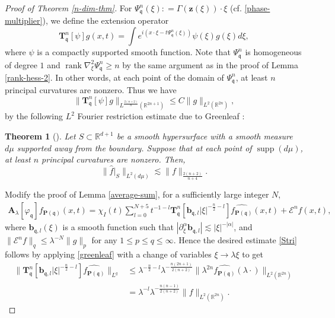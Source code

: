 \documentclass[10pt] %
{amsart}
\theoremstyle{plain}
\newtheorem{thm}{Theorem}[section]
\numberwithin{equation}{section}
\newcommand{\R}{\mathbb R}
\DeclareMathOperator{\supp}{supp}
\DeclareMathOperator{\rank}{rank}
\newcommand{\fq}{\mathfrak q}
\begin{document}
\begin{proof}[Proof of Theorem \ref{n-dim-thm}]
For $ \Psi_\fq^n (\xi) : = \Gamma(\mathbf z(\xi))\cdot \xi $ (cf. \eqref{phase-multiplier}), we define the extension operator
\[
\mathbf T_{\fq}^n [\psi] g(x,t) = \int e^{i  (x\cdot \xi - t \Psi_\fq^n (\xi)) } \psi(\xi) g(\xi) d\xi ,
\]
where $\psi$ is a compactly supported smooth function. 
Note that $\Psi_\fq^n$ is homogeneous of degree $1$ and $\rank \nabla_\xi^2 \Psi_\fq^n \ge n$ by the same argument as in the proof of Lemma \ref{rank-hess-2}. 
In other words, at each point of the domain of $ \Psi_\fq^n $, at least $n$ principal curvatures are nonzero. 
Thus we have
\begin{equation}\label{greenleaf}
\| \mathbf T_{\fq}^n [\psi] g\|_{L^{\frac{2(n+2)}{n}}(\mathbb R^{2n+1})} \le C \| g\|_{L^2(\mathbb R^{2n})} ,
\end{equation}
by the following $L^2$ Fourier restriction estimate due to Greenleaf \cite{Gr81}:
\begin{thm}[{\cite[Corollary 1]{Gr81}}]
Let $S\subset \R^{d+1}$ be a smooth hypersurface with a smooth measure $d\mu$ supported away from the boundary. Suppose that at each point of $\supp (d\mu)$, at least $n$ principal curvatures are nonzero. Then,  
\[
\big\| \widehat f \big|_S \big\|_{L^2(d\mu)} \lesssim \|f\|_{\frac{2(n+2)}{n+4}} .
\]
\end{thm}

 
Modify the proof of Lemma \ref{average-sum}, for a sufficiently large integer $N$, 
\begin{align*} 
\mathbf A_\lambda[\varphi_{\fq}] f_{\mathbf P(\fq)}(x,t)   = \chi_I(t) \sum_{l=0}^{N+5} t^{-1-l}   \mathbf T_\fq^n [\mathbf b_{\fq,l}|\xi|^{-\frac n2-l}] \widehat {f_{\mathbf P(\fq)}}   (x,t)+  \mathcal E^n  f   (x,t),
\end{align*}
 where  $\mathbf b_{\fq,l} (\xi)    $ is a smooth function such that $|\partial_\xi^\alpha \mathbf b_{\fq,l} | \lesssim |\xi|^{-|\alpha|}$, and $\|  \mathcal E^n   f  \|_q \le \lambda^{-N}\|g\|_p$ for any $1 \le p \le q \le \infty$.  
Hence the desired estimate \eqref{Stri} follows by
applying \eqref{greenleaf} with a change of variables $\xi\to\lambda\xi$ to get 
\begin{align*}
\| \mathbf T_\fq^n [\mathbf b_{\fq,l}|\xi|^{-\frac n2-l}] \widehat {f_{\mathbf P(\fq)}}  \|_{L^q} 
&\le \lambda^{-\frac n2 - l} \lambda^{-\frac{n(2n+1)}{2(n+2)}} \| \lambda^{2n} \widehat {f_{\mathbf P(\fq)}}(\lambda\cdot)\|_{L^2(\mathbb R^{2n})} \\
& = \lambda^{-l} \lambda^{ -\frac{n( n-1)}{2(n+2)}} \| f\|_{L^2(\mathbb R^{2n})} .  
\end{align*} 






\end{proof}
\end{document}
